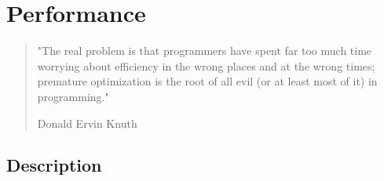 \section{Performance}
\begin{quote}
    "The real problem is that programmers have spent far too much time worrying about efficiency in the wrong places and at the wrong times; premature optimization is the root of all evil (or at least most of it) in programming." 
    \begin{flushright}
    Donald Ervin Knuth
    \end{flushright}
\end{quote}

\subsection{Description}

